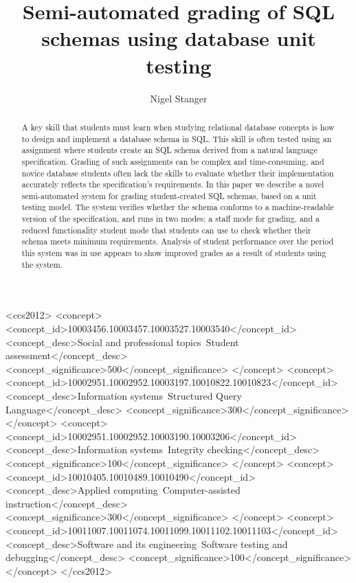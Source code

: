 \documentclass[sigconf, authordraft, capitalise]{acmart}
\title{Semi-automated grading of SQL \\ schemas using database unit testing}
\author{Nigel Stanger}
\affiliation{
    \institution{University of Otago}
    \department{Department of Information Science}
    \city{Dunedin}
    \country{New Zealand}
}
\begin{document}
\begin{abstract}
    A key skill that students must learn when studying relational database concepts is how to design and implement a database schema in SQL. This skill is often tested using an assignment where students create an SQL schema derived from a natural language specification. Grading of such assignments can be complex and time-consuming, and novice database students often lack the skills to evaluate whether their implementation accurately reflects the specification's requirements. In this paper we describe a novel semi-automated system for grading student-created SQL schemas, based on a unit testing model. The system verifies whether the schema conforms to a machine-readable version of the specification, and runs in two modes: a staff mode for grading, and a reduced functionality student mode that students can use to check whether their schema meets minimum requirements. Analysis of student performance over the period this system was in use appears to show improved grades as a result of students using the system.
\end{abstract}

\begin{CCSXML}
<ccs2012>
<concept>
<concept_id>10003456.10003457.10003527.10003540</concept_id>
<concept_desc>Social and professional topics~Student assessment</concept_desc>
<concept_significance>500</concept_significance>
</concept>
<concept>
<concept_id>10002951.10002952.10003197.10010822.10010823</concept_id>
<concept_desc>Information systems~Structured Query Language</concept_desc>
<concept_significance>300</concept_significance>
</concept>
<concept>
<concept_id>10002951.10002952.10003190.10003206</concept_id>
<concept_desc>Information systems~Integrity checking</concept_desc>
<concept_significance>100</concept_significance>
</concept>
<concept>
<concept_id>10010405.10010489.10010490</concept_id>
<concept_desc>Applied computing~Computer-assisted instruction</concept_desc>
<concept_significance>300</concept_significance>
</concept>
<concept>
<concept_id>10011007.10011074.10011099.10011102.10011103</concept_id>
<concept_desc>Software and its engineering~Software testing and debugging</concept_desc>
<concept_significance>100</concept_significance>
</concept>
</ccs2012>
\end{CCSXML}

\end{document}
